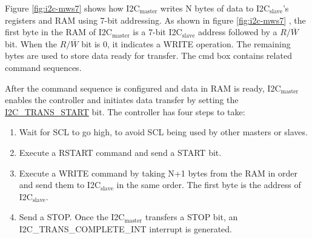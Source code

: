 \documentclass[main\_\_EN.tex]{subfiles}
\begin{document}
Figure \ref{fig:i2c-mws7} shows how I2C$_\text{master}$ writes N bytes of data to I2C$_\text{slave}$'s registers and RAM using 7-bit addressing. As shown in figure \ref{fig:i2c-mws7} , the first byte in the RAM of I2C$_\text{master}$ is a 7-bit I2C$_\text{slave}$ address followed by a $R/\overline W$ bit. When the $R/\overline W$ bit is 0, it indicates a WRITE operation. The remaining bytes are used to store data ready for transfer. The cmd box contains related command sequences.

After the command sequence is configured and data in RAM is ready, I2C$_\text{master}$ enables the controller and initiates data transfer by setting the \hyperref[fielddesc:I2CTRANSSTART]{I2C\_TRANS\_START} bit. The controller has four steps to take:
\begin{enumerate}
    \item Wait for SCL to go high, to avoid SCL being used by other masters or slaves.
    \item Execute a RSTART command and send a START bit.
    \item Execute a WRITE command by taking N+1 bytes from the RAM in order and send them to I2C$_\text{slave}$ in the same order. The first byte is the address of I2C$_\text{slave}$.
    \item Send a STOP. Once the I2C$_\text{master}$ transfers a STOP bit, an I2C\_TRANS\_COMPLETE\_INT interrupt is generated.
\end{enumerate}
\end{document}
